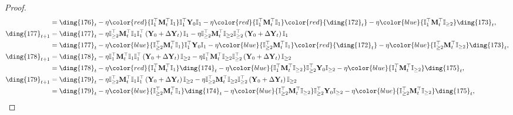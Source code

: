 \documentclass{article}
\theoremstyle{plain}
\theoremstyle{remark}
\def\bY{\mathbf{Y}}
\newcommand{\cc}[1]{\text{\ding{\number\numexpr#1 + 171\relax}}}
\newcommand{\cbb}[1]{\noindent{\color{blue}{#1}}}  %
\newcommand{\crr}[1]{\noindent{\color{red}{#1}}}  %
\begin{document}
\begin{proof}
\begin{align}
        &= \cc{5}_t-\eta\crr{\mathbb{I}_1^\top\mathbf{M}_t^\top\mathbb{I}_1}\mathbb{I}_1^\top\bY_0\mathbb{I}_1-\eta\crr{\mathbb{I}_1^\top\mathbf{M}_t^\top\mathbb{I}_1}\crr{\cc{1}_t}-\eta\cbb{\mathbb{I}_1^\top\mathbf{M}_t^\top\mathbb{I}_{\ge2}}\cc{2}_t,
        \\
        \cc{6}_{t+1} &= \cc{6}_t-\eta\mathbb{I}_{\ge 2}^\top\mathbf{M}_t^\top\mathbb{I}_{1}\mathbb{I}_{1}^\top\left(\bY_0+\Delta\bY_t\right)\mathbb{I}_1-\eta\mathbb{I}_{\ge 2}^\top\mathbf{M}_t^\top\mathbb{I}_{\ge2}\mathbb{I}_{\ge2}^\top\left(\bY_0+\Delta\bY_t\right)\mathbb{I}_1 \\
        &= \cc{6}_t-\eta\cbb{\mathbb{I}_{\ge 2}^\top\mathbf{M}_t^\top\mathbb{I}_{1}}\mathbb{I}_{1}^\top\bY_0\mathbb{I}_1 - \eta\cbb{\mathbb{I}_{\ge 2}^\top\mathbf{M}_t^\top\mathbb{I}_{1}}\crr{\cc{1}_t} -\eta\cbb{\mathbb{I}_{\ge 2}^\top\mathbf{M}_t^\top\mathbb{I}_{\ge2}}\cc{2}_t,
        \\
        \cc{7}_{t+1} &= \cc{7}_t-\eta\mathbb{I}_{1}^\top\mathbf{M}_t^\top\mathbb{I}_{1}\mathbb{I}_{1}^\top\left(\bY_0+\Delta\bY_t\right)\mathbb{I}_{\ge 2} - \eta\mathbb{I}_{1}^\top\mathbf{M}_t^\top\mathbb{I}_{\ge2}\mathbb{I}_{\ge2}^\top\left(\bY_0+\Delta\bY_t\right)\mathbb{I}_{\ge 2} \\
        &= \cc{7}_t-\eta\crr{\mathbb{I}_{1}^\top\mathbf{M}_t^\top\mathbb{I}_{1}}\cc{3}_t - \eta\cbb{\mathbb{I}_{1}^\top\mathbf{M}_t^\top\mathbb{I}_{\ge2}}\mathbb{I}_{\ge2}^\top\bY_0\mathbb{I}_{\ge 2} - \eta\cbb{\mathbb{I}_{1}^\top\mathbf{M}_t^\top\mathbb{I}_{\ge2}}\cc{4}_t,
        \\
        \cc{8}_{t+1} &= \cc{8}_t - \eta\mathbb{I}_{\ge 2}^\top\mathbf{M}_t^\top\mathbb{I}_{1}\mathbb{I}_{1}^\top\left(\bY_0+\Delta\bY_t\right)\mathbb{I}_{\ge 2} - \eta\mathbb{I}_{\ge 2}^\top\mathbf{M}_t^\top\mathbb{I}_{\ge2}\mathbb{I}_{\ge2}^\top\left(\bY_0+\Delta\bY_t\right)\mathbb{I}_{\ge 2} \\
        &= \cc{8}_t - \eta\cbb{\mathbb{I}_{\ge 2}^\top\mathbf{M}_t^\top\mathbb{I}_{1}}\cc{3}_t - \eta\cbb{\mathbb{I}_{\ge 2}^\top\mathbf{M}_t^\top\mathbb{I}_{\ge2}}\mathbb{I}_{\ge2}^\top\bY_0\mathbb{I}_{\ge 2} - \eta\cbb{\mathbb{I}_{\ge 2}^\top\mathbf{M}_t^\top\mathbb{I}_{\ge2}}\cc{4}_t,
    \end{align}

    


\end{proof}
\end{document}
